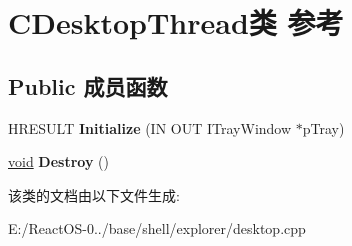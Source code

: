 \hypertarget{class_c_desktop_thread}{}\section{C\+Desktop\+Thread类 参考}
\label{class_c_desktop_thread}
\subsection*{Public 成员函数}
\begin{DoxyCompactItemize}
\item 
\mbox{\label{class_c_desktop_thread_ad7a3748e70ef879565c4e01024545d52}} 
H\+R\+E\+S\+U\+LT {\bfseries Initialize} (IN O\+UT I\+Tray\+Window $\ast$p\+Tray)
\item 
\mbox{\label{class_c_desktop_thread_a31d4ef3cdb5646e5a4b956e7dbba3290}} 
\hyperlink{interfacevoid}{void} {\bfseries Destroy} ()
\end{DoxyCompactItemize}


该类的文档由以下文件生成\+:\begin{DoxyCompactItemize}
\item 
E\+:/\+React\+O\+S-\/0../base/shell/explorer/desktop.\+cpp\end{DoxyCompactItemize}
